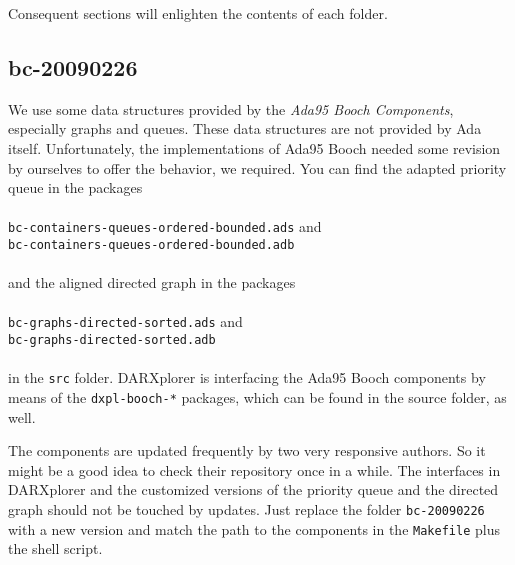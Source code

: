 \documentclass{acmtrans2m}
\begin{document}
Consequent sections will enlighten the contents of each folder.

\subsection{bc-20090226}
We use some data structures provided by the \textit{Ada95 Booch Components}, especially graphs and queues. These data structures are not provided by Ada itself. Unfortunately, the implementations of Ada95 Booch needed some revision by ourselves to offer the behavior, we required. You can find the adapted priority queue in the packages\\ \\
\noindent\hspace*{12mm}%
\texttt{bc-containers-queues-ordered-bounded.ads} and \\
\noindent\hspace*{12mm}%
\texttt{bc-containers-queues-ordered-bounded.adb}\\ \\
and the aligned directed graph in the packages\\ \\
\noindent\hspace*{12mm}%
\texttt{bc-graphs-directed-sorted.ads} and \\
\noindent\hspace*{12mm}%
\texttt{bc-graphs-directed-sorted.adb}\\ \\
in the \texttt{src} folder. DARXplorer is interfacing the Ada95 Booch components by means of the \texttt{dxpl-booch-*} packages, which can be found in the source folder, as well.

The components are updated frequently by two very responsive authors. So it might be a good idea to check their repository once in a while. The interfaces in DARXplorer and the customized versions of the priority queue and the directed graph should not be touched by updates. Just replace the folder \texttt{bc-20090226} with a new version and match the path to the components in the \texttt{Makefile} plus the shell script.
\end{document}
